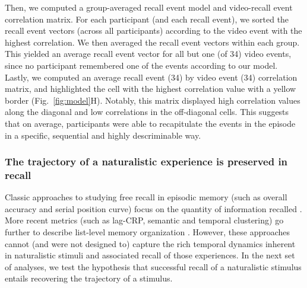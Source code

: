\documentclass{article}
\begin{document}
Then, we computed a group-averaged recall event model and video-recall event correlation matrix. For each participant (and each recall event), we sorted the recall event vectors (across all participants) according to the video event with the highest correlation. We then averaged the recall event vectors within each group. This yielded an average recall event vector for all but one (of 34) video events, since no participant remembered one of the events according to our model. Lastly, we computed an average recall event (34) by video event (34) correlation matrix, and highlighted the cell with the highest correlation value with a yellow border (Fig.~\ref{fig:model}H). Notably, this matrix displayed high correlation values along the diagonal and low correlations in the off-diagonal cells. This suggests that on average, participants were able to recapitulate the events in the episode in a specific, sequential and highly descriminable way.

\subsubsection*{The trajectory of a naturalistic experience is preserved in recall}
Classic approaches to studying free recall in episodic memory (such as overall accuracy and serial position curve) focus on the quantity of information recalled \citep{Murd62a}. More recent metrics (such as lag-CRP, semantic and temporal clustering) go further to describe list-level memory organization \citep{Kaha96, PolyEtal09}. However, these approaches cannot (and were not designed to) capture the rich temporal dynamics inherent in naturalistic stimuli and associated recall of those experiences. In the next set of analyses, we test the hypothesis that successful recall of a naturalistic stimulus entails recovering the trajectory of a stimulus.
\end{document}
